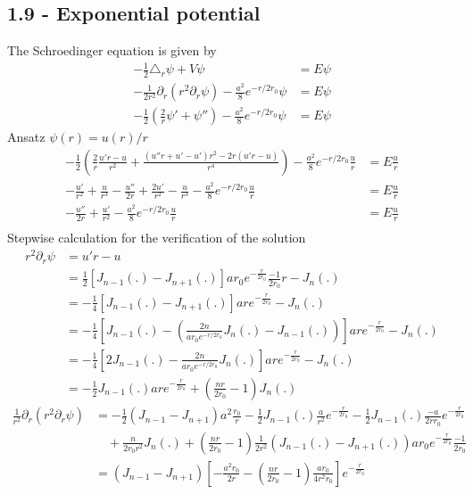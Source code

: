 \documentclass[10pt,a4paper]{book}
\theoremstyle{definition}
\begin{document}
\subsection{1.9 - Exponential potential}
The Schroedinger equation is given by
\begin{align}
-\frac{1}{2}\triangle_r\psi+V\psi&=E\psi\\
-\frac{1}{2r^2}\partial_r(r^2\partial_r \psi)-\frac{a^2}{8}e^{-r/2r_0}\psi&=E\psi\\
-\frac{1}{2}\left(\frac{2}{r}\psi'+\psi''\right)-\frac{a^2}{8}e^{-r/2r_0}\psi&=E\psi
\end{align}
Ansatz $\psi(r)=u(r)/r$
\begin{align}
-\frac{1}{2}\left(\frac{2}{r}\frac{u'r-u}{r^2}+\frac{(u''r+u'-u')r^2-2r(u'r-u)}{r^4}\right)-\frac{a^2}{8}e^{-r/2r_0}\frac{u}{r}&=E\frac{u}{r}\\
-\frac{u'}{r^2}+\frac{u}{r^3}-\frac{u''}{2r}+\frac{2u'}{r^2}-\frac{u}{r^3}-\frac{a^2}{8}e^{-r/2r_0}\frac{u}{r}&=E\frac{u}{r}\\
-\frac{u''}{2r}+\frac{u'}{r^2}-\frac{a^2}{8}e^{-r/2r_0}\frac{u}{r}&=E\frac{u}{r}\\
\end{align}
Stepwise calculation for the verification of the solution
\begin{align}
r^2\partial_r \psi
&=u'r-u\\
&=\frac{1}{2}\left[J_{n-1}(.)-J_{n+1}(.)\right]ar_0e^{-\frac{r}{2r_0}}\frac{-1}{2r_0}r-J_n(.)\\
&=-\frac{1}{4}\left[J_{n-1}(.)-J_{n+1}(.)\right]are^{-\frac{r}{2r_0}}-J_n(.)\\
&=-\frac{1}{4}\left[J_{n-1}(.)-\left(\frac{2n}{ar_0e^{-r/2r_0}}J_n(.)-J_{n-1}(.)\right)\right]are^{-\frac{r}{2r_0}}-J_n(.)\\
&=-\frac{1}{4}\left[2J_{n-1}(.)-\frac{2n}{ar_0e^{-r/2r_0}}J_n(.)\right]are^{-\frac{r}{2r_0}}-J_n(.)\\
&=-\frac{1}{2}J_{n-1}(.)are^{-\frac{r}{2r_0}}+\left(\frac{nr}{2r_0}-1\right)J_n(.)
\end{align}
\begin{align}
\frac{1}{r^2}\partial_r(r^2\partial_r \psi)
&=-\frac{1}{2}\left(J_{n-1}-J_{n+1}\right)a^2\frac{r_0}{r}-\frac{1}{2}J_{n-1}(.)\frac{a}{r^2}e^{-\frac{r}{2r_0}}-\frac{1}{2}J_{n-1}(.)\frac{-a}{2rr_0}e^{-\frac{r}{2r_0}}\\
&\quad+\frac{n}{2r_0r^2}J_n(.)+\left(\frac{nr}{2r_0}-1\right)\frac{1}{2r^2}(J_{n-1}(.)-J_{n+1}(.))ar_0e^{-\frac{r}{2r_0}}\frac{-1}{2r_0}\\
&=\left(J_{n-1}-J_{n+1}\right)\left[-\frac{a^2r_0}{2r}-\left(\frac{nr}{2r_0}-1\right)\frac{ar_0}{4r^2r_0}\right]e^{-\frac{r}{2r_0}}
\end{align}
\end{document}
